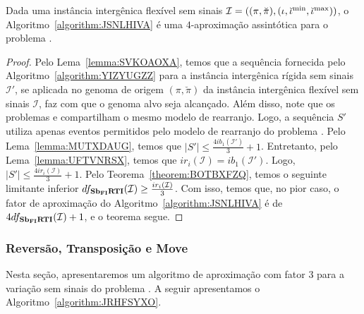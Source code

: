 \begin{theorem}\label{theorem:BBTWMULM}
Dada uma instância intergênica flexível sem sinais $\mathcal{I} = ((\pi,\breve\pi),(\iota,\breve\iota^{\min},\break\breve\iota^{\max}))$, o Algoritmo~\ref{algorithm:JSNLHIVA} é uma $4$-aproximação assintótica para o problema \SbFIRTI{}.
\end{theorem}
\begin{proof}
Pelo Lema~\ref{lemma:SVKOAOXA}, temos que a sequência fornecida pelo Algoritmo~\ref{algorithm:YIZYUGZZ} para a instância intergênica rígida sem sinais $\mathcal{I'}$, se aplicada no genoma de origem $(\pi,\breve\pi)$ da instância intergênica flexível sem sinais $\mathcal{I}$, faz com que o genoma alvo seja alcançado. Além disso, note que os problemas \SbIRTI{} e \SbFIRTI{} compartilham o mesmo modelo de rearranjo. Logo, a sequência $S'$ utiliza apenas eventos permitidos pelo modelo de rearranjo do problema \SbFIRTI{}. Pelo Lema~\ref{lemma:MUTXDAUG}, temos que $|S'| \le \frac{4ib_1(\mathcal{I}')}{3} + 1$. Entretanto, pelo Lema~\ref{lemma:UFTVNRSX}, temos que $ir_i(\mathcal{I}) = ib_1(\mathcal{I'})$. Logo, $|S'| \le \frac{4ir_i(\mathcal{I})}{3} + 1$. Pelo Teorema~\ref{theorem:BOTBXFZQ}, temos o seguinte limitante inferior $df_{\textbf{Sb\textsubscript{FI}RTI}}(\mathcal{I}) \ge \frac{ir_i(\mathcal{I})}{3}$. Com isso, temos que, no pior caso, o fator de aproximação do Algoritmo~\ref{algorithm:JSNLHIVA} é de $4df_{\textbf{Sb\textsubscript{FI}RTI}}(\mathcal{I}) + 1$, e o teorema segue.
\end{proof}

\subsubsection{Reversão, Transposição e Move}

Nesta seção, apresentaremos um algoritmo de aproximação com fator $3$ para a variação sem sinais do problema \SbFIRTM{}. A seguir apresentamos o Algoritmo~\ref{algorithm:JRHFSYXO}.



